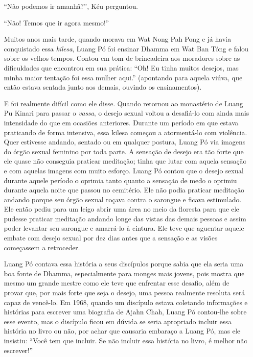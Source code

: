 ``Não podemos ir amanhã?'', Kéu perguntou.

``Não! Temos que ir agora mesmo!''

Muitos anos mais tarde, quando morava em Wat Nong Pah Pong e já havia
conquistado essa \emph{kilesa}, Luang Pó foi ensinar Dhamma em Wat Ban
Tóng e falou sobre os velhos tempos. Contou em tom de brincadeira aos
moradores sobre as dificuldades que encontrou em sua prática: ``Oh! Eu
tinha muitos desejos, mas minha maior tentação foi essa mulher aqui.''
(apontando para aquela viúva, que então estava sentada junto aos demais,
ouvindo os ensinamentos).

E foi realmente difícil como ele disse. Quando retornou ao monastério de
Luang Pu Kinari para passar o \emph{vassa}, o desejo sexual voltou a
desafiá-lo com ainda mais intensidade do que em ocasiões anteriores.
Durante um período em que estava praticando de forma intensiva, essa
kilesa começou a atormentá-lo com violência. Quer estivesse andando,
sentado ou em qualquer postura, Luang Pó via imagens do órgão sexual
feminino por toda parte. A sensação de desejo era tão forte que ele
quase não conseguia praticar meditação; tinha que lutar com aquela
sensação e com aquelas imagens com muito esforço. Luang Pó contou que o
desejo sexual durante aquele período o oprimia tanto quanto a sensação
de medo o oprimiu durante aquela noite que passou no cemitério. Ele não
podia praticar meditação andando porque seu órgão sexual roçava contra o
sarongue e ficava estimulado. Ele então pediu para um leigo abrir uma
área no meio da floresta para que ele pudesse praticar meditação andando
longe das vistas das demais pessoas e assim poder levantar seu sarongue
e amarrá-lo à cintura. Ele teve que aguentar aquele embate com desejo
sexual por dez dias antes que a sensação e as visões começassem a
retroceder.

Luang Pó contava essa história a seus discípulos porque sabia que ela
seria uma boa fonte de Dhamma, especialmente para monges mais jovens,
pois mostra que mesmo um grande mestre como ele teve que enfrentar esse
desafio, além de provar que, por mais forte que seja o desejo, uma
pessoa realmente resoluta será capaz de vencê-lo. Em 1968, quando um
discípulo estava coletando informações e histórias para escrever uma
biografia de Ajahn Chah, Luang Pó contou-lhe sobre esse evento, mas o
discípulo ficou em dúvida se seria apropriado incluir essa história no
livro ou não, por achar que causaria embaraço a Luang Pó, mas ele
insistiu: ``Você tem que incluir. Se não incluir essa história no livro,
é melhor não escrever!''

